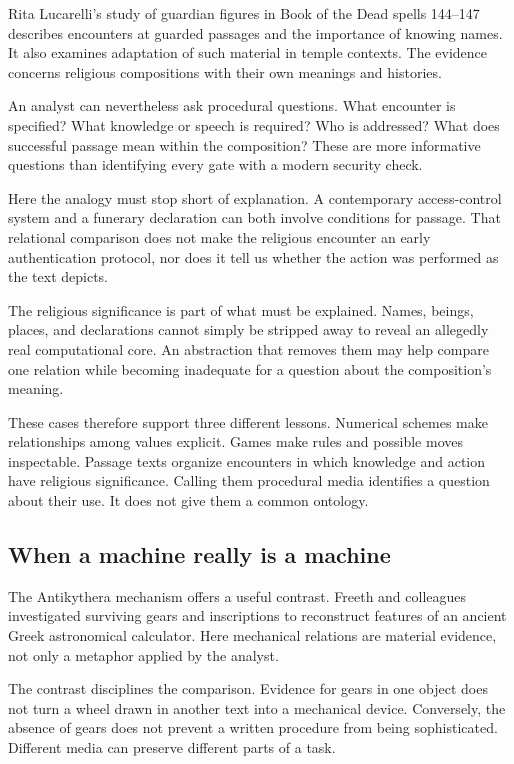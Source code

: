 \documentclass[11pt]{article}
\begin{document}
Rita Lucarelli's study of guardian figures in Book of the Dead spells
144--147 describes encounters at guarded passages and the importance of
knowing names. It also examines adaptation of such material in temple
contexts.\cite{lucarelli} The evidence concerns religious compositions
with their own meanings and histories.

An analyst can nevertheless ask procedural questions. What encounter is
specified? What knowledge or speech is required? Who is addressed? What
does successful passage mean within the composition? These are more informative
questions than identifying every gate with a modern security check.

Here the analogy must stop short of explanation. A contemporary access-control
system and a funerary declaration can both involve conditions for passage.
That relational comparison does not make the religious encounter an early
authentication protocol, nor does it tell us whether the action was performed
as the text depicts.

The religious significance is part of what must be explained. Names, beings,
places, and declarations cannot simply be stripped away to reveal an allegedly
real computational core. An abstraction that removes them may help compare
one relation while becoming inadequate for a question about the composition's
meaning.

These cases therefore support three different lessons. Numerical schemes
make relationships among values explicit. Games make rules and possible moves
inspectable. Passage texts organize encounters in which knowledge and action
have religious significance. Calling them procedural media identifies a
question about their use. It does not give them a common ontology.

\subsection{When a machine really is a machine}

The Antikythera mechanism offers a useful contrast. Freeth and colleagues
investigated surviving gears and inscriptions to reconstruct features of
an ancient Greek astronomical calculator.\cite{freeth} Here mechanical
relations are material evidence, not only a metaphor applied by the analyst.

The contrast disciplines the comparison. Evidence for gears in one object
does not turn a wheel drawn in another text into a mechanical device.
Conversely, the absence of gears does not prevent a written procedure from
being sophisticated. Different media can preserve different parts of a task.
\end{document}
